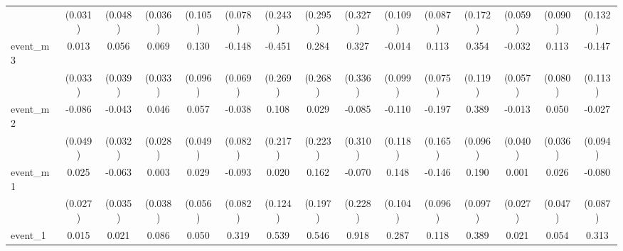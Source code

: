 {\begin{tabular}{l*{14}{c}}
            &     (0.031)         &     (0.048)         &     (0.036)         &     (0.105)         &     (0.078)         &     (0.243)         &     (0.295)         &     (0.327)         &     (0.109)         &     (0.087)         &     (0.172)         &     (0.059)         &     (0.090)         &     (0.132)         \\
[1em]
event\_m3    &       0.013         &       0.056         &       0.069\sym{*}  &       0.130         &      -0.148\sym{*}  &      -0.451         &       0.284         &       0.327         &      -0.014         &       0.113         &       0.354\sym{**} &      -0.032         &       0.113         &      -0.147         \\
            &     (0.033)         &     (0.039)         &     (0.033)         &     (0.096)         &     (0.069)         &     (0.269)         &     (0.268)         &     (0.336)         &     (0.099)         &     (0.075)         &     (0.119)         &     (0.057)         &     (0.080)         &     (0.113)         \\
[1em]
event\_m2    &      -0.086         &      -0.043         &       0.046         &       0.057         &      -0.038         &       0.108         &       0.029         &      -0.085         &      -0.110         &      -0.197         &       0.389\sym{***}&      -0.013         &       0.050         &      -0.027         \\
            &     (0.049)         &     (0.032)         &     (0.028)         &     (0.049)         &     (0.082)         &     (0.217)         &     (0.223)         &     (0.310)         &     (0.118)         &     (0.165)         &     (0.096)         &     (0.040)         &     (0.036)         &     (0.094)         \\
[1em]
event\_m1    &       0.025         &      -0.063         &       0.003         &       0.029         &      -0.093         &       0.020         &       0.162         &      -0.070         &       0.148         &      -0.146         &       0.190         &       0.001         &       0.026         &      -0.080         \\
            &     (0.027)         &     (0.035)         &     (0.038)         &     (0.056)         &     (0.082)         &     (0.124)         &     (0.197)         &     (0.228)         &     (0.104)         &     (0.096)         &     (0.097)         &     (0.027)         &     (0.047)         &     (0.087)         \\
[1em]
event\_1     &       0.015         &       0.021         &       0.086\sym{**} &       0.050         &       0.319\sym{***}&       0.539\sym{***}&       0.546         &       0.918\sym{***}&       0.287\sym{***}&       0.118         &       0.389\sym{**} &       0.021         &       0.054         &       0.313\sym{***}\\

\end{tabular}}
